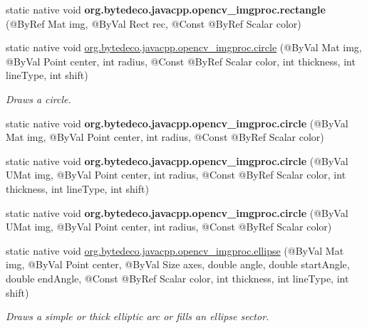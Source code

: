 \begin{DoxyCompactItemize}
\item 
\mbox{\label{group__imgproc__draw_ga9fac76aca098ad47684c5804868f9682}} 
static native void {\bfseries org.\+bytedeco.\+javacpp.\+opencv\+\_\+imgproc.\+rectangle} (@By\+Ref Mat img, @By\+Val Rect rec, @Const @By\+Ref Scalar color)
\item 
static native void \hyperlink{group__imgproc__draw_ga6f8e5000cb25b63d5885b12d46f52e39}{org.\+bytedeco.\+javacpp.\+opencv\+\_\+imgproc.\+circle} (@By\+Val Mat img, @By\+Val Point center, int radius, @Const @By\+Ref Scalar color, int thickness, int line\+Type, int shift)
\begin{DoxyCompactList}\small\item\em Draws a circle. \end{DoxyCompactList}\item 
\mbox{\label{group__imgproc__draw_ga2ff61979b3c9fb771860cf9caa93b355}} 
static native void {\bfseries org.\+bytedeco.\+javacpp.\+opencv\+\_\+imgproc.\+circle} (@By\+Val Mat img, @By\+Val Point center, int radius, @Const @By\+Ref Scalar color)
\item 
\mbox{\label{group__imgproc__draw_ga0fdb4a805b574c13646ae989c13bd03a}} 
static native void {\bfseries org.\+bytedeco.\+javacpp.\+opencv\+\_\+imgproc.\+circle} (@By\+Val U\+Mat img, @By\+Val Point center, int radius, @Const @By\+Ref Scalar color, int thickness, int line\+Type, int shift)
\item 
\mbox{\label{group__imgproc__draw_ga8c97216153de676f2d1f6afffa712e91}} 
static native void {\bfseries org.\+bytedeco.\+javacpp.\+opencv\+\_\+imgproc.\+circle} (@By\+Val U\+Mat img, @By\+Val Point center, int radius, @Const @By\+Ref Scalar color)
\item 
static native void \hyperlink{group__imgproc__draw_ga775ad50d707d4e99bd6f123f702e55a2}{org.\+bytedeco.\+javacpp.\+opencv\+\_\+imgproc.\+ellipse} (@By\+Val Mat img, @By\+Val Point center, @By\+Val Size axes, double angle, double start\+Angle, double end\+Angle, @Const @By\+Ref Scalar color, int thickness, int line\+Type, int shift)
\begin{DoxyCompactList}\small\item\em Draws a simple or thick elliptic arc or fills an ellipse sector. \end{DoxyCompactList}\item 

\end{DoxyCompactItemize}
